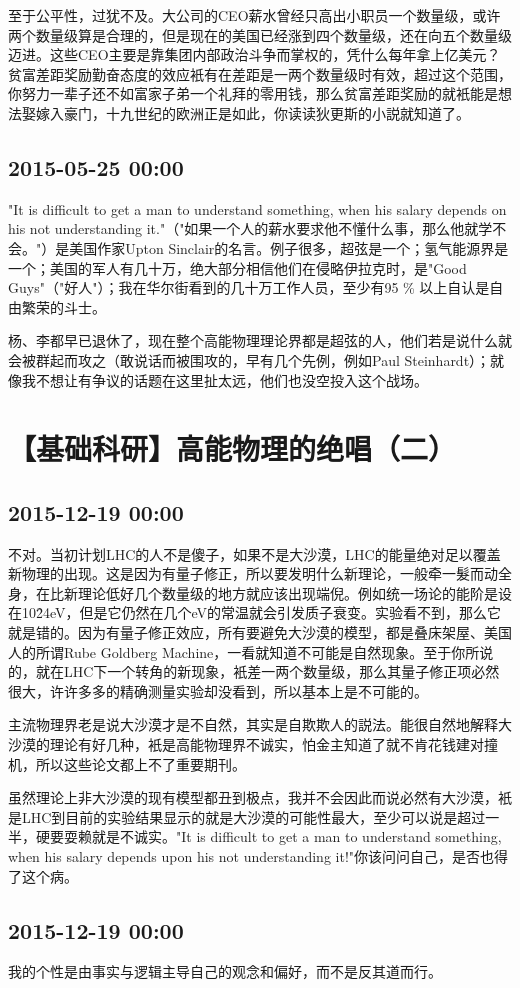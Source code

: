 \documentclass[twocolumn]{ctexart}
\begin{document}
至于公平性，过犹不及。大公司的CEO薪水曾经只高出小职员一个数量级，或许两个数量级算是合理的，但是现在的美国已经涨到四个数量级，还在向五个数量级迈进。这些CEO主要是靠集团内部政治斗争而掌权的，凭什么每年拿上亿美元？贫富差距奖励勤奋态度的效应衹有在差距是一两个数量级时有效，超过这个范围，你努力一辈子还不如富家子弟一个礼拜的零用钱，那么贫富差距奖励的就衹能是想法娶嫁入豪门，十九世纪的欧洲正是如此，你读读狄更斯的小説就知道了。\subsection*{2015-05-25 00:00}
"It is difficult to get a man to understand something, when his salary depends on his not understanding it."（"如果一个人的薪水要求他不懂什么事，那么他就学不会。"）是美国作家Upton Sinclair的名言。例子很多，超弦是一个；氢气能源界是一个；美国的军人有几十万，绝大部分相信他们在侵略伊拉克时，是"Good Guys"（"好人"）；我在华尔街看到的几十万工作人员，至少有95 \% 以上自认是自由繁荣的斗士。

杨、李都早已退休了，现在整个高能物理理论界都是超弦的人，他们若是说什么就会被群起而攻之（敢说话而被围攻的，早有几个先例，例如Paul Steinhardt）；就像我不想让有争议的话题在这里扯太远，他们也没空投入这个战场。\section*{【基础科研】高能物理的绝唱（二）}
\subsection*{2015-12-19 00:00}
不对。当初计划LHC的人不是傻子，如果不是大沙漠，LHC的能量绝对足以覆盖新物理的出现。这是因为有量子修正，所以要发明什么新理论，一般牵一髮而动全身，在比新理论低好几个数量级的地方就应该出现端倪。例如统一场论的能阶是设在10\^24eV，但是它仍然在几个eV的常温就会引发质子衰变。实验看不到，那么它就是错的。因为有量子修正效应，所有要避免大沙漠的模型，都是叠床架屋、美国人的所谓Rube Goldberg Machine，一看就知道不可能是自然现象。至于你所说的，就在LHC下一个转角的新现象，衹差一两个数量级，那么其量子修正项必然很大，许许多多的精确测量实验却没看到，所以基本上是不可能的。

主流物理界老是说大沙漠才是不自然，其实是自欺欺人的説法。能很自然地解释大沙漠的理论有好几种，衹是高能物理界不诚实，怕金主知道了就不肯花钱建对撞机，所以这些论文都上不了重要期刊。

虽然理论上非大沙漠的现有模型都丑到极点，我并不会因此而说必然有大沙漠，衹是LHC到目前的实验结果显示的就是大沙漠的可能性最大，至少可以说是超过一半，硬要耍赖就是不诚实。"It is difficult to get a man to understand something, when his salary depends upon his not understanding it!"你该问问自己，是否也得了这个病。\subsection*{2015-12-19 00:00}
我的个性是由事实与逻辑主导自己的观念和偏好，而不是反其道而行。
\end{document}
